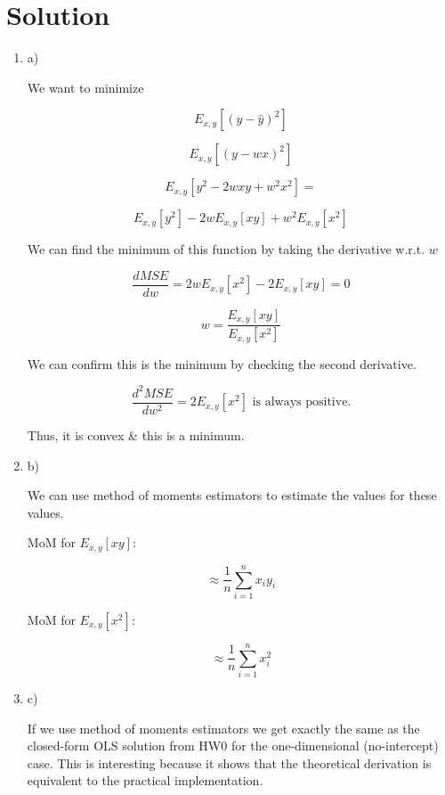 \documentclass[submit]{../harvardml}
\newenvironment{solution}
  {\color{blue}\section*{Solution}}
{}
\begin{document}
\newpage
\begin{solution}



\begin{tcolorbox}[title=Solution,colback=white,colframe=black, breakable]

\begin{enumerate}
  \item a)

  We want to minimize

  \[
  E_{x,y} \left[ (y - \hat{y})^2 \right]
  \]
  
  \[
  E_{x,y} \left[ (y - w x)^2 \right]
  \]
  
  \[
  E_{x,y} \left[ y^2 - 2wx y + w^2 x^2 \right] =
  \]
  
  \[
  E_{x,y} \left[ y^2 \right] - 2w E_{x,y} \left[ xy \right] + w^2 E_{x,y} \left[ x^2 \right]
  \]
  
  We can find the minimum of this function by taking the derivative w.r.t. \( w \)
  
  \[
  \frac{d MSE}{dw} = 2w E_{x,y} \left[ x^2 \right] - 2 E_{x,y} \left[ xy \right] = 0
  \]
  
  \[
  w = \frac{E_{x,y} \left[ xy \right]}{ E_{x,y} \left[ x^2 \right]}
  \]

  We can confirm this is the minimum by checking the second derivative.

  \[
  \frac{d^2 MSE}{dw^2} = 2 E_{x,y} \left[ x^2 \right] \text{ is always positive.}
  \]
  
  Thus, it is convex \& this is a minimum.


  \item b)

  We can use method of moments estimators to estimate the values for these values.


  MoM for \( E_{x,y} \left[ xy \right] \):

\[
\approx \frac{1}{n} \sum_{i=1}^{n} x_i y_i
\]

MoM for \( E_{x,y} \left[ x^2 \right] \):

\[
\approx \frac{1}{n} \sum_{i=1}^{n} x_i^2
\]




  \item c)

  If we use method of moments estimators we get exactly the same as the closed-form OLS solution from HW0 for the one-dimensional (no-intercept) case. 
  This is interesting because it shows that the theoretical derivation is equivalent to the practical implementation.





\end{enumerate}
\end{tcolorbox}
\end{solution}
\end{document}
